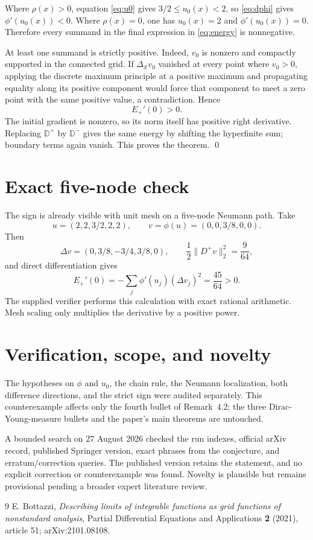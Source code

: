 \documentclass[10pt]{article}
\newcommand{\DX}{\Delta_{\mathbb X}}
\newcommand{\Dp}{\mathbb D^+}
\newcommand{\Dm}{\mathbb D^-}
\begin{document}
Where $\rho(x)>0$, equation \eqref{eq:u0} gives
$3/2\leq u_0(x)<2$, so \eqref{eq:dphi} gives
$\phi'(u_0(x))<0$.  Where $\rho(x)=0$, one has $u_0(x)=2$ and
$\phi'(u_0(x))=0$.  Therefore every summand in the final expression in
\eqref{eq:energy} is nonnegative.

At least one summand is strictly positive.  Indeed, $v_0$ is nonzero and
compactly supported in the connected grid.  If $\DX v_0$ vanished at every
point where $v_0>0$, applying the discrete maximum principle at a positive
maximum and propagating equality along its positive component would force
that component to meet a zero point with the same positive value, a
contradiction.  Hence
\[
 E_+'(0)>0.
\]
The initial gradient is nonzero, so its norm itself has positive right
derivative.  Replacing $\Dp$ by $\Dm$ gives the same energy by shifting the
hyperfinite sum; boundary terms again vanish.  This proves the theorem. \qed

\section*{Exact five-node check}

The sign is already visible with unit mesh on a five-node Neumann path.  Take
\[
 u=(2,2,3/2,2,2),\qquad
 v=\phi(u)=(0,0,3/8,0,0).
\]
Then
\[
 \Delta v=(0,3/8,-3/4,3/8,0),\qquad
 \frac12\|D^+v\|_2^2=\frac9{64},
\]
and direct differentiation gives
\[
 E_+'(0)=-\sum_j\phi'(u_j)(\Delta v_j)^2=\frac{45}{64}>0.
\]
The supplied verifier performs this calculation with exact rational
arithmetic.  Mesh scaling only multiplies the derivative by a positive power.

\section*{Verification, scope, and novelty}

The hypotheses on $\phi$ and $u_0$, the chain rule, the Neumann localization,
both difference directions, and the strict sign were audited separately.
This counterexample affects only the fourth bullet of Remark~4.2; the three
Dirac-Young-measure bullets and the paper's main theorems are untouched.

A bounded search on 27 August 2026 checked the run indexes, official arXiv
record, published Springer version, exact phrases from the conjecture, and
erratum/correction queries.  The published version retains the statement, and
no explicit correction or counterexample was found.  Novelty is plausible but
remains provisional pending a broader expert literature review.

\begin{thebibliography}{9}
E. Bottazzi,
\emph{Describing limits of integrable functions as grid functions of
nonstandard analysis}, Partial Differential Equations and Applications
\textbf{2} (2021), article 51; arXiv:2101.08108.
\end{thebibliography}
\end{document}
